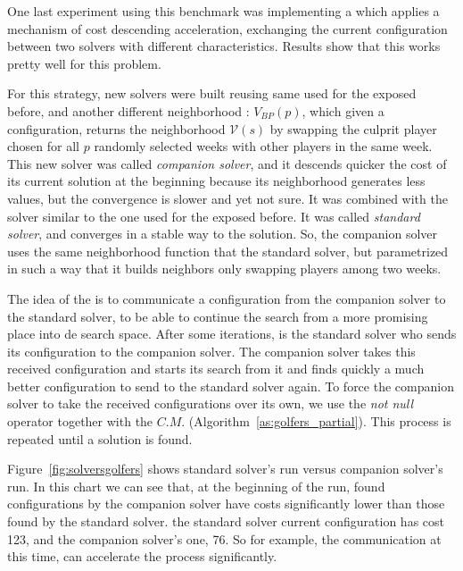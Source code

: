 \separation

One last experiment using this benchmark was implementing a \commstr{} which applies a mechanism of cost descending acceleration, exchanging the current configuration between two solvers with different characteristics. Results show that this \commstr{} works pretty well for this problem.

For this strategy, new solvers were built reusing same \ms{} used for the \commstrs{} exposed before, and another different neighborhood \om{}: $V_{BP}(p)$, which given a configuration, returns the neighborhood $\mathcal{V}\left(s\right)$ by swapping the culprit player chosen for all $p$ randomly selected weeks with other players in the same week. This new solver was called \textit{companion solver}, and it descends quicker the cost of its current solution at the beginning because its neighborhood generates less values, but the convergence is slower and yet not sure. It was combined with the solver similar to the one used for the \commstrs{} exposed before. It was called \textit{standard solver}, and converges in a stable way to the solution. So, the companion solver uses the same neighborhood function that the standard solver, but parametrized in such a way that it builds neighbors only swapping players among two weeks.

The idea of the \commstr{} is to communicate a configuration from the companion solver to the standard solver, to be able to continue the search from a more promising place into de search space. After some iterations, is the standard solver who sends its configuration to the companion solver. The companion solver takes this received configuration and starts its search from it and finds quickly a much better configuration to send to the standard solver again. To force the companion solver to take the received configurations over its own, we use the \textit{not null} operator together with the \opch{} $C.M.$ (Algorithm~\ref{as:golfers_partial}). This process is repeated until a solution is found.

Figure~\ref{fig:solversgolfers} shows standard solver's run versus companion solver's run. In this chart we can see that, at the beginning of the run, found configurations by the companion solver have costs significantly lower than those found by the standard solver.  the standard solver current configuration has cost 123, and the companion solver's one, 76. So for example, the communication at this time, can accelerate the process significantly.

